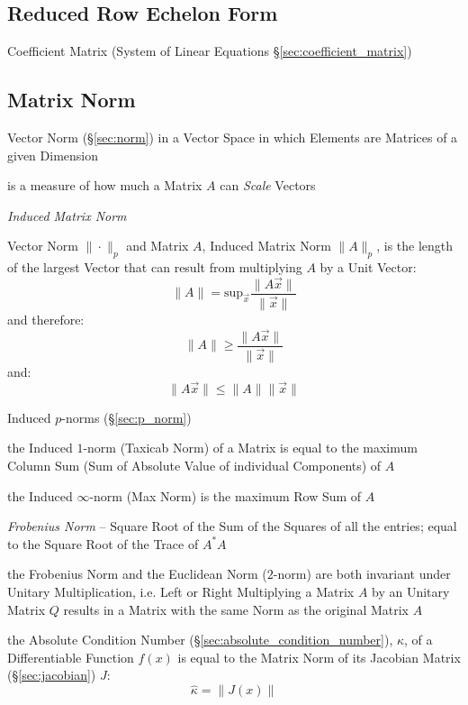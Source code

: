 \subsection{Reduced Row Echelon Form}\label{sec:reduced_row_echelon}

Coefficient Matrix (System of Linear Equations \S\ref{sec:coefficient_matrix})



\subsection{Matrix Norm}\label{sec:matrix_norm}

Vector Norm (\S\ref{sec:norm}) in a Vector Space in which Elements are Matrices
of a given Dimension

is a measure of how much a Matrix $A$ can \emph{Scale} Vectors

\emph{Induced Matrix Norm}

Vector Norm $\|\cdot\|_p$ and Matrix $A$, Induced Matrix Norm $\|A\|_p$, is the
length of the largest Vector that can result from multiplying $A$ by a Unit
Vector:
\[
  \|A\| = \mathrm{sup}_{\vec{x}} \frac{\|A\vec{x}\|}{\|\vec{x}\|}
\]
and therefore:
\[
  \|A\| \geq \frac{\|A\vec{x}\|}{\|\vec{x}\|}
\]
and:
\[
  \|A\vec{x}\| \leq \|A\| \|\vec{x}\|
\]

Induced $p$-norms (\S\ref{sec:p_norm})

the Induced $1$-norm (Taxicab Norm) of a Matrix is equal to the maximum Column
Sum (Sum of Absolute Value of individual Components) of $A$

the Induced $\infty$-norm (Max Norm) is the maximum Row Sum of $A$


\emph{Frobenius Norm} -- Square Root of the Sum of the Squares of all the
entries; equal to the Square Root of the Trace of $A^*A$


the Frobenius Norm and the Euclidean Norm ($2$-norm) are both invariant under
Unitary Multiplication, i.e. Left or Right Multiplying a Matrix $A$ by an
Unitary Matrix $Q$ results in a Matrix with the same Norm as the original
Matrix $A$

the Absolute Condition Number (\S\ref{sec:absolute_condition_number}),
$\hat{\kappa}$, of a Differentiable Function $f(x)$ is equal to the Matrix Norm
of its Jacobian Matrix (\S\ref{sec:jacobian}) $J$:
\[
  \hat{\kappa} = \|J(x)\|
\]

